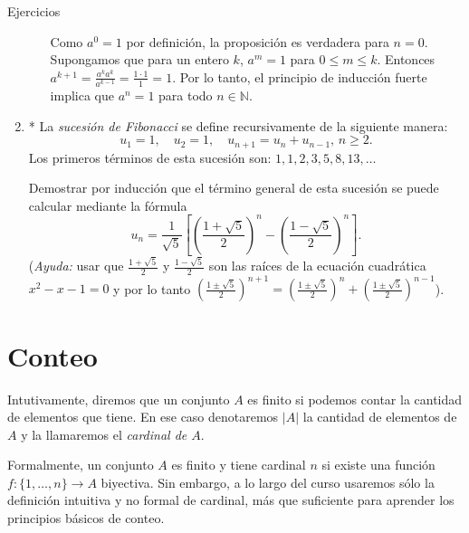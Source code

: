 \begin{section}{Ejercicios}
\begin{enumerate}
\begin{enumerate}
            Como $a^0=1$ por definición, la proposición es verdadera para $n=0$. Supongamos
            que para  un entero $k$, $a^m=1$ para $0\leq m \leq k$. Entonces
            $a^{k+1}= \frac{a^k a^k}{a^{k-1}}=\frac{1\cdot1}1=1$.
            Por lo tanto, el principio de inducción fuerte implica que $a^n=1$ para todo $n\in \mathbb N$.
        \end{enumerate}

        \item* La \emph{sucesión de Fibonacci} se define recursivamente de la siguiente manera:
        $$
        u_1=1,\quad u_2=1,\quad u_{n+1}=u_{n}+u_{n-1}, \, n\geq 2.
        $$
        Los primeros términos de esta sucesión son: $1,1,2,3,5,8,13,\ldots$

        Demostrar por inducción que el término general de esta sucesión se puede calcular mediante la fórmula
        \[ u_n= \frac{1}{\sqrt{5}}\left[\left(\frac{1+\sqrt{5}}{2}\right)^n-\left(\frac{1-\sqrt{5}}{2}\right)^n\right].\]
        (\textit{Ayuda:} usar que $\frac{1+\sqrt{5}}{2}$ y $\frac{1-\sqrt{5}}{2}$ son las raíces de la ecuación cuadrática $x^2-x-1=0$ y por lo tanto  $\left(\frac{1\pm\sqrt{5}}{2}\right)^{n+1} = \left(\frac{1\pm\sqrt{5}}{2}\right)^{n}+\left(\frac{1\pm\sqrt{5}}{2}\right)^{n-1}$).
    \end{enumerate}
\end{section}





\chapter[Conteo]{Conteo}\label{cap.conteo}

Intutivamente, diremos que un conjunto $A$ es finito si podemos contar la cantidad de elementos que tiene. En ese caso denotaremos $|A|$ la cantidad de elementos de $A$ y la llamaremos el {\em cardinal de $A$}.  

Formalmente, un conjunto $A$ es finito y tiene  cardinal $n$  si existe una función $f: \{1,\ldots,n\} \to A$ biyectiva. Sin embargo,  a lo largo del curso usaremos sólo la definición intuitiva y  no formal de cardinal, más que suficiente para aprender los principios básicos de conteo.  

